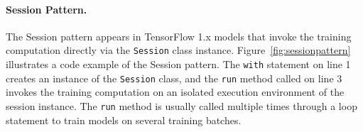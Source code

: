 




\paragraph{Session Pattern.} 
The Session pattern appears in TensorFlow 1.x models that invoke the training
computation directly via the {\tt Session} class instance.
Figure~\ref{fig:sessionpattern} illustrates a code example of the Session
pattern. 
The {\tt with} statement on line 1 creates an instance of the {\tt Session}
class, and the {\tt run} method called on line 3 invokes the training
computation on an isolated execution environment of the session instance. 
The {\tt run} method is usually called multiple times through a loop statement
to train models on several training batches.


